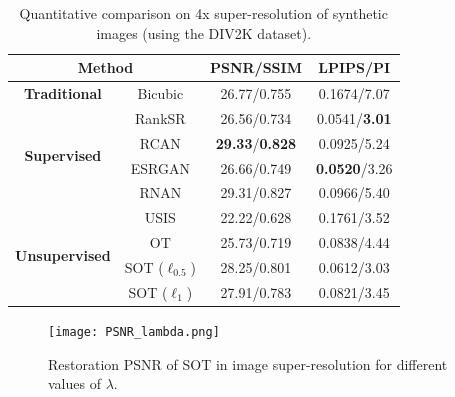 \documentclass[10pt,journal,compsoc]{IEEEtran}
\begin{document}
\begin{table}[!t]
	\renewcommand\arraystretch{2}
	\footnotesize
	\centering
	\caption{Quantitative comparison on 4x super-resolution of synthetic images (using the DIV2K dataset).}
        \begin{tabular}{|cc|c|c|}
		\hline
		\multicolumn{2}{|c|}{\textbf{Method}}                               & \textbf{PSNR/SSIM} & \textbf{LPIPS/PI}            \\ \hline
		\multicolumn{1}{|c|}{\textbf{Traditional}}                   & Bicubic & 26.77/0.755 & 0.1674/7.07 \\ \hline
		\multicolumn{1}{|c|}{\multirow{4}{*}{\textbf{Supervised}}}  & RankSR\cite{ranksrgan}  & 26.56/0.734 & 0.0541/\textbf{3.01} \\ \cline{2-4} 
		\multicolumn{1}{|c|}{}                       & RCAN\cite{rcan}    & \textbf{29.33}/\textbf{0.828} & 0.0925/5.24 \\ \cline{2-4} 
		\multicolumn{1}{|c|}{}                       & ESRGAN\cite{wang2018esrgan}  & 26.66/0.749 & \textbf{0.0520}/3.26 \\ \cline{2-4} 
		\multicolumn{1}{|c|}{}                       & RNAN\cite{rnan}    & 29.31/0.827 & 0.0966/5.40 \\ \hline
		\multicolumn{1}{|c|}{\multirow{4}{*}{\textbf{Unsupervised}}} & USIS\cite{usis}    & 22.22/0.628 & 0.1761/3.52 \\ \cline{2-4} 
		\multicolumn{1}{|c|}{}                       & OT\cite{wang2022optimal}     & 25.73/0.719 & 0.0838/4.44 \\ \cline{2-4} 
		\multicolumn{1}{|c|}{}                       & SOT ($\ell_{0.5}$)   & 28.25/0.801 & 0.0612/3.03 \\ \cline{2-4} 
		\multicolumn{1}{|c|}{}                       & SOT ($\ell_1$)  & 27.91/0.783 & 0.0821/3.45 \\ \hline
	\end{tabular}
\end{table}

\begin{figure}[!t]
	\centering
	\texttt{[image: PSNR\_lambda.png]}
	\caption{Restoration PSNR of SOT in image super-resolution for different values of $\lambda$.}
	\label{figure2}
\end{figure}
\end{document}
